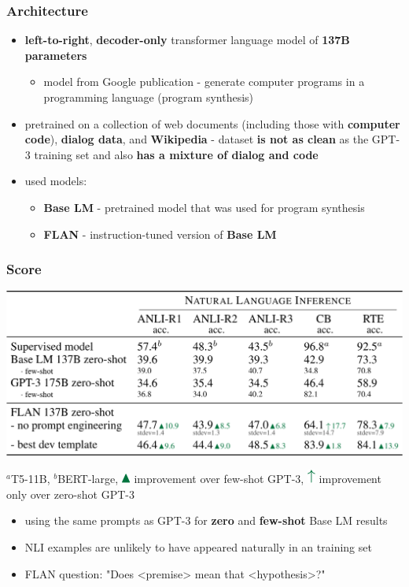 \documentclass{beamer}
\begin{document}
\begin{frame}
    \frametitle{Architecture}
    \begin{itemize}
        \item \textbf{left-to-right}, \textbf{decoder-only} transformer language model of \textbf{137B parameters}
        \begin{itemize}
            \item model from Google publication - generate computer programs in a programming language (program synthesis)
        \end{itemize}
        \item pretrained on a collection of web documents (including
those with \textbf{computer code}), \textbf{dialog data}, and \textbf{Wikipedia} - dataset \textbf{is not as clean} as the GPT-3 training set and also \textbf{has a mixture of dialog and code}
        \item used models:
        \begin{itemize}
            \item \textbf{Base LM} - pretrained model that was used for program synthesis
            \item \textbf{FLAN} - instruction-tuned version of \textbf{Base LM}
        \end{itemize}
    \end{itemize}
\end{frame}

\begin{frame}
    \frametitle{Score}
    \begin{center}
        \includegraphics[scale=1.05]{img/score_nli.png}
    \end{center}
    \tiny{$^a$T5-11B, $^b$BERT-large, \includegraphics[scale=1.0]{img/up_arrow_1.png} improvement over few-shot GPT-3, \includegraphics[scale=1.0]{img/up_arrow_2.png} improvement only over zero-shot GPT-3}
    \begin{itemize}
    \footnotesize
        \item using the same prompts as GPT-3 for \textbf{zero} and \textbf{few-shot} Base LM results
        \item NLI examples are unlikely to have appeared naturally in an training set
        \item FLAN question: "Does <premise> mean that <hypothesis>?"
    \end{itemize}
\end{frame}
\end{document}
